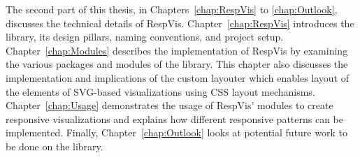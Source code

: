 The second part of this thesis, in Chapters~\ref{chap:RespVis} to
\ref{chap:Outlook}, discusses the technical details of RespVis.
Chapter~\ref{chap:RespVis} introduces the library, its design pillars,
naming conventions, and project setup. Chapter~\ref{chap:Modules}
describes the implementation of RespVis by examining the various
packages and modules of the library. This chapter also discusses the
implementation and implications of the custom layouter which enables
layout of the elements of SVG-based visualizations using CSS layout
mechanisms. Chapter~\ref{chap:Usage} demonstrates the usage of
RespVis' modules to create responsive visualizations and explains how
different responsive patterns can be implemented. Finally,
Chapter~\ref{chap:Outlook} looks at potential future work to be done
on the library.

